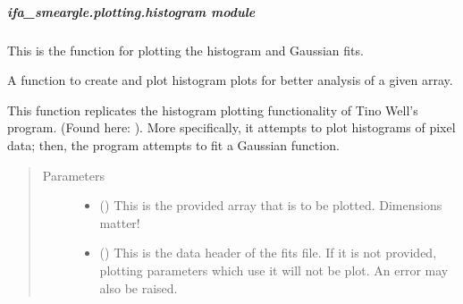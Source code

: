 \documentclass[letterpaper,10pt,english]{sphinxmanual}
\begin{document}
\subparagraph{ifa\_smeargle.plotting.histogram module}
\label{\detokenize{docstrings/ifa_smeargle.plotting.histogram:module-ifa_smeargle.plotting.histogram}}\label{\detokenize{docstrings/ifa_smeargle.plotting.histogram:ifa-smeargle-plotting-histogram-module}}\label{\detokenize{docstrings/ifa_smeargle.plotting.histogram::doc}}
This is the function for plotting the histogram and Gaussian fits.

\begin{fulllineitems}
\label{\detokenize{docstrings/ifa_smeargle.plotting.histogram:ifa_smeargle.plotting.histogram.plot_gaussian_histogram}}
A function to create and plot histogram plots for better
analysis of a given array.

This function replicates the histogram plotting functionality
of Tino Well’s program.
(Found here: ). More
specifically, it attempts to plot histograms of pixel data; then,
the program attempts to fit a Gaussian function.
\begin{quote}\begin{description}
\item[{Parameters}] \leavevmode\begin{itemize}
\item {} 
 () \textendash{} This is the provided array that is to be plotted.
Dimensions matter!

\item {} 
 (\sphinxstyleliteralemphasis{\sphinxupquote{ (}}\sphinxstyleliteralemphasis{\sphinxupquote{)}}) \textendash{} This is the data header of the fits file. If it is not
provided, plotting parameters which use it will not be plot.
An error may also be raised.


\end{itemize}
\end{description}
\end{quote}
\end{fulllineitems}
\end{document}
